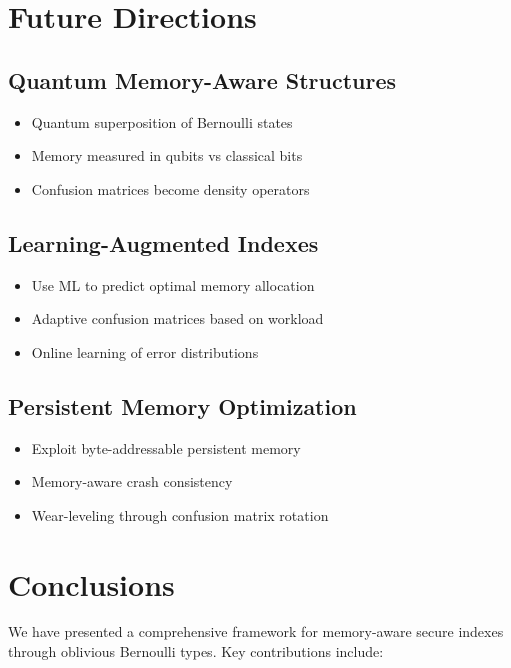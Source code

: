 \documentclass[11pt,final]{article}
\begin{document}
\section{Future Directions}

\subsection{Quantum Memory-Aware Structures}

\begin{itemize}
    \item Quantum superposition of Bernoulli states
    \item Memory measured in qubits vs classical bits
    \item Confusion matrices become density operators
\end{itemize}

\subsection{Learning-Augmented Indexes}

\begin{itemize}
    \item Use ML to predict optimal memory allocation
    \item Adaptive confusion matrices based on workload
    \item Online learning of error distributions
\end{itemize}

\subsection{Persistent Memory Optimization}

\begin{itemize}
    \item Exploit byte-addressable persistent memory
    \item Memory-aware crash consistency
    \item Wear-leveling through confusion matrix rotation
\end{itemize}

\section{Conclusions}

We have presented a comprehensive framework for memory-aware secure indexes through oblivious Bernoulli types. Key contributions include:
\end{document}
